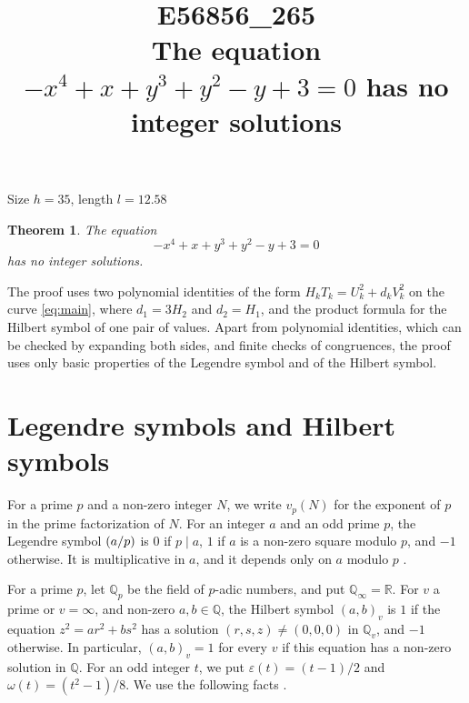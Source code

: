 \documentclass[11pt]{article}
\title{\textbf{E56856\_265}\\[4pt] {\Large The equation $-x^{4}+x+y^{3}+y^{2}-y+3=0$ has no integer solutions}}
\author{}
\date{}
\newtheorem{theorem}{Theorem}
\newcommand{\Q}{\mathbb{Q}}
\newcommand{\leg}[2]{\mathchoice{\biggl(\dfrac{#1}{#2}\biggr)}{(#1/#2)}{(#1/#2)}{(#1/#2)}}
\begin{document}
\maketitle
\vspace{-8ex}
\begin{center}
Size $h=35$, length $l=12.58$
\end{center}

\begin{theorem}\label{thm:main}
The equation
\begin{equation}\label{eq:main}
-x^{4}+x+y^{3}+y^{2}-y+3=0
\end{equation}
has no integer solutions.
\end{theorem}

The proof uses two polynomial identities of the form $H_kT_k=U_k^2+d_kV_k^2$ on the curve \eqref{eq:main}, where $d_{1}=3H_{2}$ and $d_{2}=H_{1}$, and the product formula for the Hilbert symbol of one pair of values. Apart from polynomial identities, which can be checked by expanding both sides, and finite checks of congruences, the proof uses only basic properties of the Legendre symbol and of the Hilbert symbol.

\section{Legendre symbols and Hilbert symbols}

For a prime $p$ and a non-zero integer $N$, we write $v_p(N)$ for the exponent of $p$ in the prime factorization of $N$. For an integer $a$ and an odd prime $p$, the Legendre symbol $\leg{a}{p}$ is $0$ if $p\mid a$, $1$ if $a$ is a non-zero square modulo $p$, and $-1$ otherwise. It is multiplicative in $a$, and it depends only on $a$ modulo $p$ \cite[Chapter~5]{IR}.

For a prime $p$, let $\Q_p$ be the field of $p$-adic numbers, and put $\Q_\infty=\mathbb R$. For $v$ a prime or $v=\infty$, and non-zero $a,b\in\Q$, the Hilbert symbol $(a,b)_v$ is $1$ if the equation $z^2=ar^2+bs^2$ has a solution $(r,s,z)\neq(0,0,0)$ in $\Q_v$, and $-1$ otherwise. In particular, $(a,b)_v=1$ for every $v$ if this equation has a non-zero solution in $\Q$. For an odd integer $t$, we put $\varepsilon(t)=(t-1)/2$ and $\omega(t)=(t^2-1)/8$. We use the following facts \cite[Chapter~III, Proposition~2 and Theorems~1 and~3]{Se}.
\end{document}
